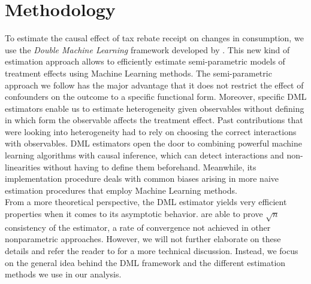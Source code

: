 \section{Methodology} \label{sec:methodology}
To estimate the causal effect of tax rebate receipt on changes in consumption, we use the \textit{Double Machine Learning} framework developed by \cite{DML2017}. This new kind of estimation approach allows to efficiently estimate semi-parametric models of treatment effects using Machine Learning methods. The semi-parametric approach we follow has the major advantage that it does not restrict the effect of confounders on the outcome to a specific functional form. Moreover, specific DML estimators enable us to estimate heterogeneity given observables without defining in which form the observable affects the treatment effect. Past contributions that were looking into heterogeneity had to rely on choosing the correct interactions with observables. DML estimators open the door to combining powerful machine learning algorithms with causal inference, which can detect interactions and non-linearities without having to define them beforehand. Meanwhile, its implementation procedure deals with common biases arising in more naive estimation procedures that employ Machine Learning methods. \\
From a more theoretical perspective, the DML estimator yields very efficient properties when it comes to its asymptotic behavior. \cite{DML2017} are able to prove $\sqrt{n}$ consistency of the estimator, a rate of convergence not achieved in other nonparametric approaches. However, we will not further elaborate on these details and refer the reader to \cite{DML2017} for a more technical discussion. Instead, we focus on the general idea behind the DML framework and the different estimation methods we use in our analysis.

